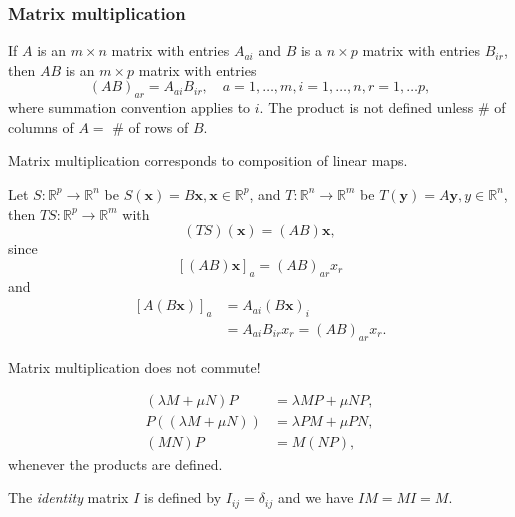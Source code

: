 \documentclass[a4paper]{article}
\begin{document}
\subsubsection{Matrix multiplication}
If $A$ is an $m\times n$ matrix with entries $A_{ai}$ and $B$ is a
$n\times p$ matrix with entries $B_{ir}$, then $AB$ is an $m\times p$
matrix with entries
\[
  (AB)_{ar}=A_{ai}B_{ir}, \quad a=1,\dots,m,i=1,\dots,n,r=1,\dots p,
\]
where summation convention applies to $i$. The product is not defined
unless \# of columns of $A=$ \# of rows of $B$.

Matrix multiplication corresponds to composition of linear maps.
\begin{example}
  Let $ S:\mathbb{R}^{p}\to \mathbb{R}^{n} $ be $ S(\mathbf{x})=B
  \mathbf{x}, \mathbf{x}\in \mathbb{R}^{p} $, and $
  T:\mathbb{R}^{n}\to \mathbb{R}^{m} $ be $ T(\mathbf{y})=A
  \mathbf{y}, y\in \mathbb{R}^{n} $, then $ TS:\mathbb{R}^{p}\to
  \mathbb{R}^{m} $ with
  \[
    (TS)(\mathbf{x})=(AB) \mathbf{x}
  ,\]
  since
  \[
    [(AB)\mathbf{x}]_{a}=(AB)_{ar}x_r
  \]
  and
  \[
    \begin{aligned}
      [A(B \mathbf{x})]_{a}&=A_{ai}(B \mathbf{x})_{i}\\
      &= A_{ai}B_{ir}x_r =(AB)_{ar}x_r.
    \end{aligned}
  \]
\end{example}
\begin{remark}
  Matrix multiplication does not commute!
\end{remark}
\begin{proposition}\label{prop:Properties of matrix multiplication}
  \[
    \begin{aligned}
      (\lambda M+\mu N)P&=\lambda M P+\mu N P,\\
      P((\lambda M+\mu N))&=\lambda PM+ \mu PN,\\
      (MN)P&=M(NP),
  \end{aligned}\]
  whenever the products are defined.
\end{proposition}
The \textit{identity} matrix $I$ is defined by $ I_{ij}=\delta_{ij} $
and we have $ IM=MI=M $.
\end{document}
